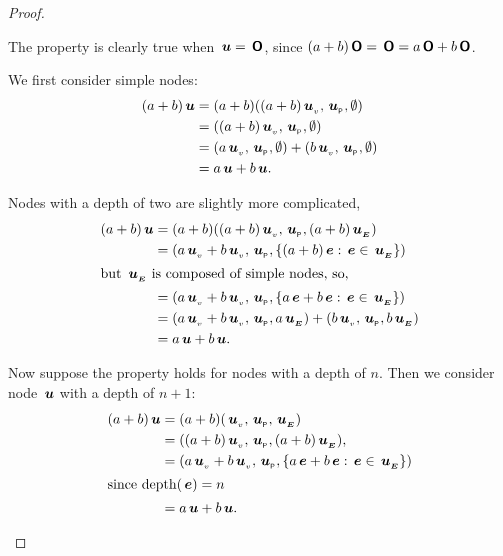 \begin{proposition}
\begin{proof}
\begin{description}
      The property is clearly true when \(\node{u} = \zerotree\),
      since \((a+b)\zerotree = \zerotree = a\zerotree+b\zerotree\).

      We first consider simple nodes:
      \begin{align*}
        (a + b)\node{u} &= (a + b) ((a + b)\nv{u}, \nlabel{u}, \emptyset) \\
        &= ((a + b)\nv{u}, \nlabel{u}, \emptyset) \\
        &= (a\nv{u}, \nlabel{u}, \emptyset) + (b  \nv{u}, \nlabel{u}, \emptyset) \\
        &= a \node{u} + b \node{u}.
      \end{align*}

      Nodes with a depth of two are slightly more complicated, 
      \begin{align*}
          (a + b)\node{u} &= (a + b) ((a + b)\nv{u}, \nlabel{u}, (a + b)\extn{u}) \\
          &= (a\nv{u} + b  \nv{u}, \nlabel{u}, \{(a + b)\node{e}:\node{e}\in\extn{u}\}) \\
          \intertext{but \(\extn{u}\) is composed of simple nodes, so,}
          &= (a\nv{u} + b  \nv{u}, \nlabel{u}, \{a \node{e} + b \node{e}:\node{e}\in\extn{u}\}) \\
          &= (a\nv{u} + b  \nv{u}, \nlabel{u}, a\extn{u}) + (b  \nv{u}, \nlabel{u}, b\extn{u}) \\
          &= a \node{u} + b \node{u}.
      \end{align*}

      
      Now suppose the property holds for nodes with a depth of \(n\).
      Then we consider node \(\node{u}\) with a depth of \(n+1\):
      \begin{align*}
          (a + b)\node{u} &= (a + b) (\nv{u}, \nlabel{u}, \extn{u}) \\
          &= ((a + b)\nv{u}, \nlabel{u}, (a + b)\extn{u}), \\
          &= (a\nv{u} + b  \nv{u}, \nlabel{u}, \{a \node{e} + b \node{e}:\node{e}\in\extn{u}\}) \\
        \intertext{since \(\depth(\node{e}) = n\)}
          &= a \node{u} + b \node{u}.
      \end{align*}


\end{description}
\end{proof}
\end{proposition}
